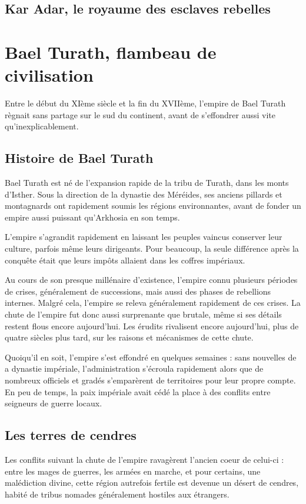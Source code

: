 \documentclass[10pt,a4paper]{book}
\begin{document}
\section{Kar Adar, le royaume des esclaves rebelles}


\chapter{Bael Turath, flambeau de civilisation}
Entre le début du XIème siècle et la fin du XVIIème, l'empire de Bael Turath règnait sans partage sur le sud du continent, avant de s'effondrer aussi vite qu'inexplicablement.
\section{Histoire de Bael Turath}
Bael Turath est né de l'expansion rapide de la tribu de Turath, dans les monts d'Isther. Sous la direction de la dynastie des Méréides, ses anciens pillards et montagnards ont rapidement soumis les régions environnantes, avant de fonder un empire aussi puissant qu'Arkhosia en son temps.

L'empire s'agrandit rapidement en laissant les peuples vaincus conserver leur culture, parfois même leurs dirigeants. Pour beaucoup, la seule différence après la conquête était que leurs impôts allaient dans les coffres impériaux.

Au cours de son presque millénaire d'existence, l'empire connu plusieurs périodes de crises, généralement de successions, mais aussi des phases de rebellions internes. Malgré cela, l'empire se releva généralement rapidement de ces crises. La chute de l'empire fut donc aussi surprenante que brutale, même si ses détails restent flous encore aujourd'hui. Les érudits rivalisent encore aujourd'hui, plus de quatre siècles plus tard, sur les raisons et mécanismes de cette chute.

Quoiqu'il en soit, l'empire s'est effondré en quelques semaines : sans nouvelles de a dynastie impériale, l'administration s'écroula rapidement alors que de nombreux officiels et gradés s'emparèrent de territoires pour leur propre compte. En peu de temps, la paix impériale avait cédé la place à des conflits entre seigneurs de guerre locaux.
\section{Les terres de cendres}
Les conflits suivant la chute de l'empire ravagèrent l'ancien coeur de celui-ci : entre les mages de guerres, les armées en marche, et pour certains, une malédiction divine, cette région autrefois fertile est devenue un désert de cendres, habité de tribus nomades généralement hostiles aux étrangers. 
\end{document}
